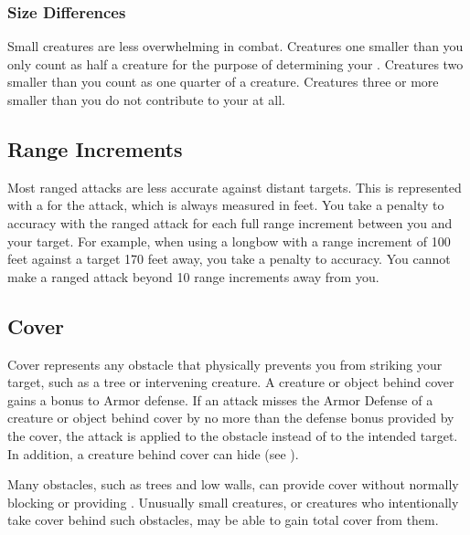         \subsubsection{Size Differences}
            Small creatures are less overwhelming in combat.
            Creatures one  smaller than you only count as half a creature for the purpose of determining your .
            Creatures two  smaller than you count as one quarter of a creature.
            Creatures three or more  smaller than you do not contribute to your  at all.

    \subsection{Range Increments}\label{Range Increments}
        Most  ranged attacks are less accurate against distant targets.
        This is represented with a  for the attack, which is always measured in feet.
        You take a  penalty to accuracy with the ranged attack for each full range increment between you and your target.
        For example, when using a longbow with a range increment of 100 feet against a target 170 feet away, you take a  penalty to accuracy.
        You cannot make a ranged attack beyond 10 range increments away from you.

    \subsection{Cover}\label{Cover}

        Cover represents any obstacle that physically prevents you from striking your target, such as a tree or intervening creature.
        A creature or object behind cover gains a  bonus to Armor defense.
        If an attack misses the Armor Defense of a creature or object behind cover by no more than the defense bonus provided by the cover,
        the attack is applied to the obstacle instead of to the intended target.
        In addition, a creature behind cover can hide (see ).

         Many obstacles, such as trees and low walls, can provide cover without normally blocking  or providing .
        Unusually small creatures, or creatures who intentionally take cover behind such obstacles, may be able to gain total cover from them.

